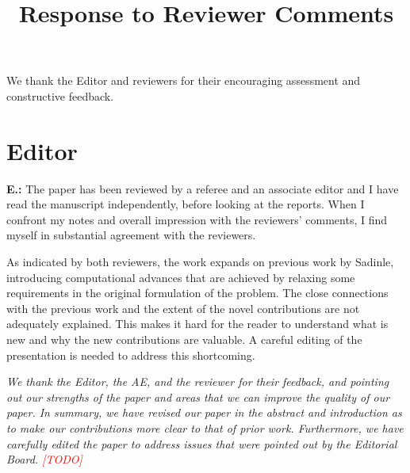 \documentclass[letterpaper, parskip]{scrartcl}
\newcommand{\pointRaised}[2]{%
	\textbf{#1.\theresponsectr:} #2
}
\newcounter{responsectr}[section]     %
\newcommand{\reply}[1]{%
	\refstepcounter{responsectr}%
		\begin{tcolorbox}
			\itshape #1
		\end{tcolorbox}
}
\newcommand{\todo}{\textcolor{red}{[TODO]}\xspace}
\begin{document}

	\title{Response to Reviewer Comments}

	\maketitle
	We thank the Editor and reviewers for their encouraging assessment and constructive
	feedback.


	\section*{Editor}


	\pointRaised{E}{%
	The paper has been reviewed by a referee and an associate editor and I have read the manuscript independently, before looking at the reports.  When I confront my notes and overall impression with the reviewers’ comments, I find myself in substantial agreement with the reviewers.

	As indicated by both reviewers, the work expands on previous work by Sadinle, introducing computational advances that are achieved by relaxing some requirements in the original formulation of the problem.  The close connections with the previous work and the extent of the novel contributions are not adequately explained.  This makes it hard for the reader to understand what is new and why the new contributions are valuable.  A careful editing of the presentation is needed to address this shortcoming.}

			\reply{%
	We thank the Editor, the AE, and the reviewer for their feedback, and pointing out our strengths of the paper and areas that we can improve the quality of our paper. In summary, we have revised our paper in the abstract and introduction as to make our contributions more clear to that of prior work.  Furthermore, we have carefully edited the paper to address issues that were pointed out by the Editorial Board. \todo
	}

	\newpage
\end{document}
